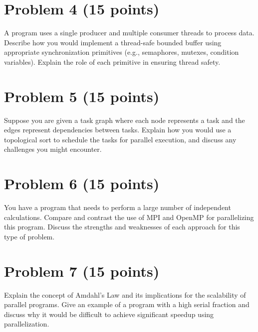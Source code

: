 \documentclass{article}
\begin{document}

\section*{Problem 4 (15 points)}
A program uses a single producer and multiple consumer threads to process data. Describe how you would implement a thread-safe bounded buffer using appropriate synchronization primitives (e.g., semaphores, mutexes, condition variables).  Explain the role of each primitive in ensuring thread safety.


\section*{Problem 5 (15 points)}
Suppose you are given a task graph where each node represents a task and the edges represent dependencies between tasks.  Explain how you would use a topological sort to schedule the tasks for parallel execution, and discuss any challenges you might encounter.


\section*{Problem 6 (15 points)}
You have a program that needs to perform a large number of independent calculations.  Compare and contrast the use of MPI and OpenMP for parallelizing this program. Discuss the strengths and weaknesses of each approach for this type of problem.



\section*{Problem 7 (15 points)}
Explain the concept of Amdahl's Law and its implications for the scalability of parallel programs.  Give an example of a program with a high serial fraction and discuss why it would be difficult to achieve significant speedup using parallelization.


\end{document}
